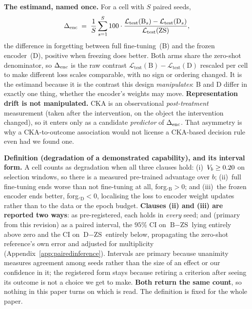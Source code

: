 \textbf{The estimand, named once.} For a cell with $S$ paired seeds,
\begin{equation}
\label{eq:denc}
\Delta_\text{enc} \;=\; \frac{1}{S}\sum_{s=1}^{S} 100 \cdot
\frac{\mathcal{L}_\text{test}(\text{B}_s) - \mathcal{L}_\text{test}(\text{D}_s)}
     {\mathcal{L}_\text{test}(\text{ZS})},
\end{equation}
the difference in forgetting between full fine-tuning~(B) and the frozen
encoder~(D), positive when freezing does better.  Both arms share the zero-shot
denominator, so $\Delta_\text{enc}$ is the raw contrast
$\mathcal{L}_\text{test}(\text{B})-\mathcal{L}_\text{test}(\text{D})$ rescaled per
cell to make different loss scales comparable, with no sign or ordering changed.
It is the estimand because it is the contrast this design \emph{manipulates}: B
and D differ in exactly one thing, whether the encoder's weights may move.
\textbf{Representation drift is not manipulated.}  CKA is an observational
\emph{post-treatment} measurement (taken after the intervention, on the object
the intervention changed), so it enters only as a candidate \emph{predictor} of
$\Delta_\text{enc}$.  That asymmetry is why a CKA-to-outcome association would not license a
CKA-based decision rule even had we found one.

\textbf{Definition (degradation of a demonstrated capability), and its interval
form.} A cell counts as degradation when all three clauses hold: (i)~$V_{b} \ge
0.20$ on selection windows, so there is a measured pre-trained advantage over
$b$; (ii)~full fine-tuning ends worse than not fine-tuning at all,
forg.$_\text{B} > 0$; and (iii)~the frozen encoder ends better,
forg.$_\text{D} < 0$, localising the loss to encoder weight updates rather than
to the data or the epoch budget. \textbf{Clauses (ii) and (iii) are reported two
ways}: as pre-registered, each holds in \emph{every} seed; and (primary from
this revision) as a paired interval, the $95\%$ CI on
$\text{B}{-}\text{ZS}$ lying entirely above zero and the CI on
$\text{D}{-}\text{ZS}$ entirely below, propagating the zero-shot reference's own
error and adjusted for multiplicity (Appendix~\ref{app:pairedinference}).
Intervals are primary because unanimity measures agreement among seeds rather
than the size of an effect or our confidence in it; the registered form stays
because retiring a criterion after seeing its outcome is not a choice we get to
make. \textbf{Both return the same count}, so nothing in this paper turns on
which is read. The definition is fixed for the whole paper.

